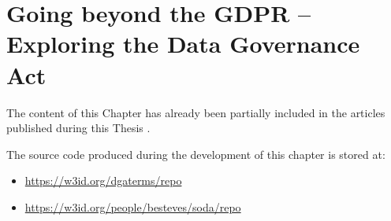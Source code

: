 \chapter{Going beyond the GDPR -- Exploring the Data Governance Act}
\label{chap:dga}

\begin{tcolorbox}[colback=royallavender!40]
The content of this Chapter has already been partially included in the articles published during this Thesis \citep{esteves_semantifying_2022,esteves_semantics_2023,esteves_towards_2023}.
\end{tcolorbox}

\begin{tcolorbox}[colback=royallavender!10]
The source code produced during the development of this chapter is stored at:
\begin{itemize}
    \item \url{https://w3id.org/dgaterms/repo}
    \item \url{https://w3id.org/people/besteves/soda/repo}
\end{itemize}
\end{tcolorbox}

